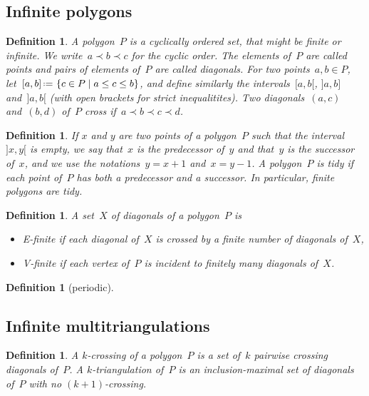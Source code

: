 \documentclass{amsart}
\newtheorem{definition}[theorem]{Definition}
\theoremstyle{remark}
\newcommand{\darkblue}{\color{darkblue}} %
\newcommand{\defn}[1]{\textsl{\darkblue #1}} %
\newcommand{\set}[2]{\left\{ #1 \;\middle|\; #2 \right\}} %
\newcommand{\eqdef}{\mbox{\,\raisebox{0.2ex}{\scriptsize\ensuremath{\mathrm:}}\ensuremath{=}\,}} %
\newcommand*{\ef}[0]{E-finite\xspace}
\newcommand*{\vf}[0]{V-finite\xspace}
\newcommand{\cl}{\prec}
\begin{document}

\subsection{Infinite polygons}

\begin{definition}
A \defn{polygon}~$P$ is a cyclically ordered set, that might be finite or infinite.
We write~$a \cl b \cl c$ for the cyclic order.
The elements of~$P$ are called \defn{points} and pairs of elements of~$P$ are called \defn{diagonals}.
For two points~$a,b \in P$, let~$[a,b] \eqdef \set{c \in P}{a \le c \le b}$, and define similarly the intervals~$[a,b[$, $]a,b]$ and~$]a,b[$ (with open brackets for strict inequalitites).
Two diagonals~$(a,c)$ and~$(b,d)$ of~$P$ \defn{cross} if~$a \cl b \cl c \cl d$.
\end{definition}

\begin{definition}
If $x$ and $y$ are two points of a polygon~$P$ such that the interval~$]x,y[$ is empty, we say that~$x$ is the \defn{predecessor} of~$y$ and that~$y$ is the \defn{successor} of~$x$, and we use the notations~$y = x+1$ and~$x = y-1$. A polygon~$P$ is \defn{tidy} if each point of~$P$ has both a predecessor and a successor. In particular, finite polygons are tidy.
\end{definition}

\begin{definition}
A set~$X$ of diagonals of a polygon~$P$ is 
\begin{itemize}
\item \defn{\ef} if each diagonal of~$X$ is crossed by a finite number of diagonals of~$X$,
\item \defn{\vf} if each vertex of~$P$ is incident to finitely many diagonals of~$X$.
\end{itemize}
\end{definition}

\begin{definition}[periodic]

\end{definition}


\subsection{Infinite multitriangulations}

\begin{definition}
A \defn{$k$-crossing} of a polygon~$P$ is a set of~$k$ pairwise crossing diagonals of~$P$.
A \defn{$k$-triangulation} of~$P$ is an inclusion-maximal set of diagonals of~$P$ with no $(k+1)$-crossing.
\end{definition}
\end{document}
